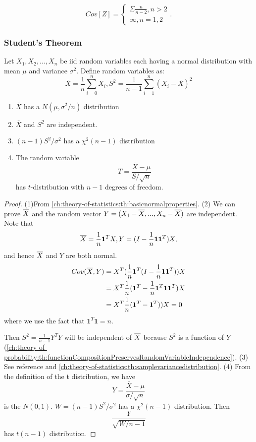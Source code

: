 \begin{refsection}
\begin{lemma}
	$$Cov[Z] = \begin{cases}
	\Sigma\frac{n}{n-2}, n > 2 \\
	\infty, n=1,2
	\end{cases}.$$ 
\end{lemma}


\subsubsection{Student's Theorem}

\begin{theorem}\cite[194]{hoggintroduction}\label{ch:theory-of-statistics:th:studentTheorem}
	Let $X_1,X_2,...,X_n$ be iid random variables each having a normal distribution with mean $\mu$ and variance $\sigma^2$. Define random variables as:\cite{hoggintroduction}
	$$\bar{X} = \frac{1}{n}\sum_{i=0}^nX_i, S^2=\frac{1}{n-1}\sum_{i=1}^n(X_i-\bar{X})^2 $$
	\begin{enumerate}
		\item $\bar{X}$ has a $N(\mu,\sigma^2/n)$ distribution
		\item $\bar{X}$ and $S^2$ are independent.
		\item $(n-1)S^2/\sigma^2$ has a $\chi^2(n-1)$ distribution
		\item The random variable $$T = \frac{\bar{X}-\mu}{S/\sqrt{n}}$$ has $t$-distribution with $n-1$ degrees of freedom.
	\end{enumerate}	
\end{theorem}
\begin{proof}
	(1)From \autoref{ch:theory-of-statistics:th:basicnormalproperties}. (2)
	We can prove $\overline{X}$ and the random vector $Y=(X_1-\overline{X},...,X_n-\overline{X})$ are independent. Note that
	$$\overline{X} = \frac{1}{n}\bm{1}^TX, Y = (I - \frac{1}{n}\bm{1}\bm{1}^T)X,$$
	and hence $\overline{X}$ and $Y$ are both normal. 
	\begin{align*}
	Cov(\overline{X},Y) &= X^T(\frac{1}{n}\bm{1}^T(I -\frac{1}{n}\bm{1}\bm{1}^T))X \\
	&=X^T\frac{1}{n}(\bm{1}^T - \frac{1}{n}\bm{1}^T\bm{1}\bm{1}^T)X \\
	&=X^T\frac{1}{n}(\bm{1}^T - \bm{1}^T))X = 0
	\end{align*}
	where we use the fact that $\bm{1}^T\bm{1} = n$.
	
	
	
	Then $S^2 = \frac{1}{n-1}Y^TY$ will be independent of $\overline{X}$ because $S^2$ is a function of $Y$(\autoref{ch:theory-of-probability:th:functionCompositionPreservesRandomVariableIndependence}).
	(3) See reference and \autoref{ch:theory-of-statistics:th:samplevariancedistribution}. (4) From the definition of the t distribution, we have
	$$Y=\frac{\bar{X}-\mu}{\sigma/\sqrt{n}}$$
	is the $N(0,1)$. $W=(n-1)S^2/\sigma^2$ has a $\chi^2(n-1)$ distribution. 
	Then 
	$$\frac{Y}{\sqrt{W/n-1}}$$ has $t(n-1)$ distribution.
\end{proof}


\end{refsection}
